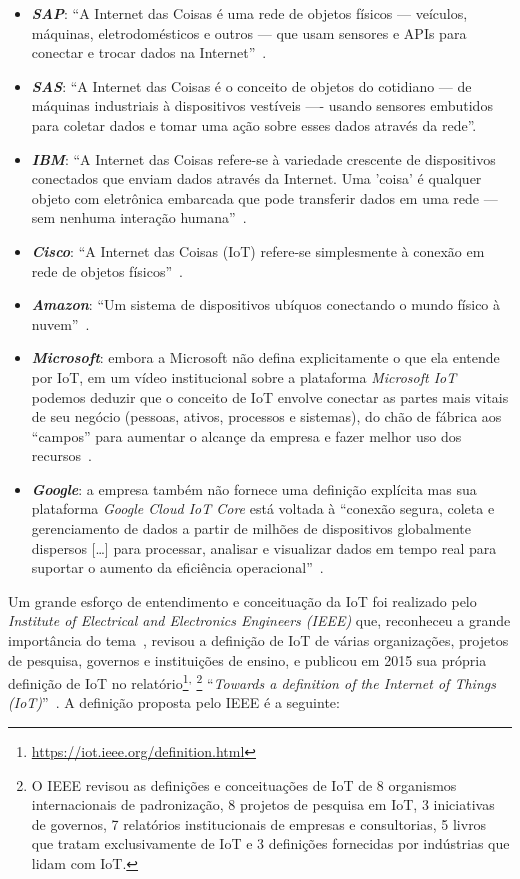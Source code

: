 \documentclass[pdftex, brazil, 12pt, twoside]{article}
\newcommand{\ingles}[1]{\textit{#1}}
\begin{document}
\begin{itemize}
\item \emph{\textbf{SAP}}: ``A Internet das Coisas é uma rede de objetos físicos --- veículos,
  máquinas, eletrodomésticos e outros --- que usam sensores e APIs para conectar e
  trocar dados na Internet''~\citep{SAPWhatIoT}.
\item \emph{\textbf{SAS}}: ``A Internet das Coisas é o conceito de objetos do cotidiano --- de
  máquinas industriais à dispositivos vestíveis ---- usando sensores embutidos para coletar
  dados e tomar uma ação sobre esses dados através da rede''\citep{SASWhatIoT}.
\item \emph{\textbf{IBM}}: ``A Internet das Coisas refere-se à variedade crescente
  de dispositivos conectados que enviam dados através da Internet. Uma 'coisa' é qualquer
  objeto com eletrônica embarcada que pode transferir dados em uma rede --- sem nenhuma
  interação humana''~\citep{IBMWhatIsIoT,IBMWhatsonIoT}.
\item \emph{\textbf{Cisco}}: ``A Internet das Coisas (IoT) refere-se simplesmente à conexão
  em rede de objetos físicos''~\citep{CiscoIoTVS2013}.
\item \emph{\textbf{Amazon}}: ``Um sistema de dispositivos ubíquos conectando o mundo
  físico à nuvem''~\citep{AmazonIoT}.
\item \emph{\textbf{Microsoft}}: embora a Microsoft não defina explicitamente o que
  ela entende por IoT, em um vídeo institucional sobre a plataforma \emph{Microsoft IoT}
  podemos deduzir que o conceito de IoT envolve conectar as partes mais vitais de
  seu negócio (pessoas, ativos, processos e sistemas), do chão de fábrica aos ``campos''
  para aumentar o alcançe da empresa e fazer melhor uso dos recursos~\citep{MicrosoftIoT}.
\item \emph{\textbf{Google}}: a empresa também não fornece uma definição explícita mas
  sua plataforma \emph{Google Cloud IoT Core} está voltada à ``conexão segura, coleta e
  gerenciamento de dados a partir de milhões de dispositivos globalmente dispersos [\ldots]
  para processar, analisar e visualizar dados em tempo real para suportar o aumento
  da eficiência operacional''~\citep{GoogleWhatsIoT}.
\end{itemize}

Um grande esforço de entendimento e conceituação da IoT foi realizado pelo \ingles{Institute
  of Electrical and Electronics Engineers (IEEE)} que, reconheceu a grande importância
do tema~\citep{IEEEIoTReport}, revisou a definição de IoT
de várias organizações, projetos de pesquisa, governos e instituições de ensino, e publicou
em 2015 sua própria definição de IoT no
relatório\footnote{\url{https://iot.ieee.org/definition.html}}\textsuperscript{, }\footnote{O IEEE revisou
  as definições e conceituações de IoT de 8 organismos internacionais de padronização, 8 projetos
  de pesquisa em IoT, 3 iniciativas de governos, 7 relatórios institucionais de empresas e
  consultorias, 5 livros que tratam exclusivamente de IoT e 3 definições fornecidas por indústrias
que lidam com IoT.}
``\ingles{Towards a definition of
  the Internet of Things (IoT)}''~\citep{IEEEIoTDefinition}. A definição proposta
pelo IEEE é a seguinte:
\end{document}
